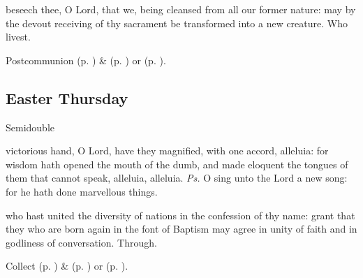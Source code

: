 
\postcommunion
{} beseech thee, O Lord, that we, being cleansed from all our former nature: may by the devout receiving of thy sacrament be transformed into a new creature. Who livest.
\begin{rubric}
     Postcommunion  (p. \pageref{EasterPostcommunion}) \&   (p. \pageref{SPAgainst}) or  (p. \pageref{SPChiefBishop}).
\end{rubric}


\clearpage
\subsection{Easter Thursday}
\begin{inhead}
    {Semidouble}
\end{inhead}


\introit
{} victorious hand, O Lord, have they magnified, with one accord, alleluia: for wisdom hath opened the mouth of the dumb, and made eloquent the tongues of them that cannot speak, alleluia, alleluia. \textit{Ps.} O sing unto the Lord a new song: for he hath done marvellous things.

\collect
{} who hast united the diversity of nations in the confession of thy name: grant that they who are born again in the font of Baptism may agree in unity of faith and in godliness of conversation. Through.
\begin{rubric}
     Collect  (p. \pageref{EasterCollect}) \&   (p. \pageref{SPAgainst}) or  (p. \pageref{SPChiefBishop}).
\end{rubric}

